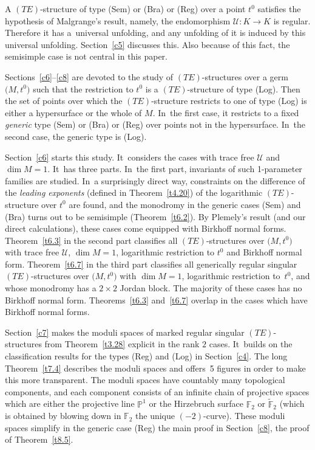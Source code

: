 \documentclass[10pt,a4paper]{amsart}
\numberwithin{equation}{section}
\numberwithin{figure}{section}
\renewcommand{\P}{{\mathbb P}}
\newcommand{\F}{{\mathbb F}}
\newcommand{\UU}{{\mathcal U}}
\newcommand{\www}{\widetilde}
\begin{document}
A $(TE)$-structure of type (Sem) or (Bra) or (Reg) over
a point $t^0$ satisfies the hypothesis of Malgrange's result,
namely, the endomorphism $\UU\colon K\to K$ is regular. Therefore it
has a~uni\-ver\-sal unfolding, and any unfolding of it is
induced by this universal unfolding. %
Section~\ref{c5} discusses this.
Also because of this fact, the semisimple case is not
central in this paper.

Sections~\ref{c6}--\ref{c8} are devoted to the study
of $(TE)$-structures over a germ $\big(M,t^0\big)$ such that
the restriction to $t^0$ is a $(TE)$-structure of type (Log).
Then the set of points over which the $(TE)$-structure
restricts to one of type (Log) is either a hypersurface or
the whole of $M$. In~the first case, it restricts to a fixed
{\it generic} type (Sem) or (Bra) or (Reg) over points
not in the hypersurface. In~the second case, the generic
type is (Log).

Section~\ref{c6} starts this study. It~considers the
cases with trace free $\UU$ and $\dim M=1$. It~has three parts. In~the first part, invariants of
such 1-parameter families are studied. In~a surprisingly
direct way, constraints on the difference of the
{\it leading exponents} (defined in Theorem~\ref{t4.20})
of the logarithmic $(TE)$-structure over $t^0$ are found,
and the monodromy in the generic cases (Sem) and (Bra) turns
out to be semisimple (Theorem~\ref{t6.2}).
By Plemely's result (and our direct calculations),
these cases come equipped with Birkhoff normal forms.
Theorem~\ref{t6.3} in the second part
classifies all $(TE)$-structures over $\big(M,t^0\big)$ with
trace free $\UU$, $\dim M=1$, logarithmic restriction to $t^0$
and Birkhoff normal form.
Theorem~\ref{t6.7} in the third part classifies all
generically regular singular $(TE)$-structures over $\big(M,t^0\big)$
with $\dim M=1$, logarithmic restriction to~$t^0$, and
whose monodromy has a $2\times 2$ Jordan block.
The majority of these cases has no Birkhoff normal
form. Theorems~\ref{t6.3} and~\ref{t6.7} overlap
in the cases which have Birkhoff normal forms.

Section~\ref{c7} makes the moduli spaces of marked regular
singular $(TE)$-structures from Theorem~\ref{t3.28}
explicit in the rank $2$ cases. It~builds on the classification
results for the types (Reg) and (Log) in Section~\ref{c4}.
The long Theorem~\ref{t7.4} describes the moduli spaces
and offers~5 figures in order to make this more transparent.
The moduli spaces have countably many topological components,
and each component consists of an infinite chain of
projective spaces which are either the projective line $\P^1$
or the Hirzebruch surface $\F_2$ or $\www\F_2$ (which is
obtained by blowing down in $\F_2$ the unique $(-2)$-curve).
These moduli spaces simplify in the generic case (Reg)
the main proof in Section~\ref{c8}, the proof of Theorem~\ref{t8.5}.
\end{document}
